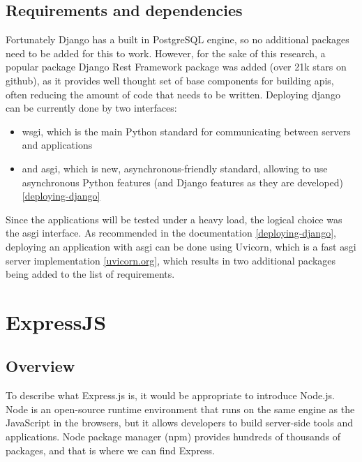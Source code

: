 \subsection{Requirements and dependencies}
Fortunately Django has a built in PostgreSQL engine, so no additional packages need to be added for this to work. However, for the sake of this research, a popular package Django Rest Framework package was added (over 21k stars on github), as it provides well thought set of base components for building \acrshort{api}s, often reducing the amount of code that needs to be written.
Deploying django can be currently done by two interfaces:
\begin{itemize}
    \item \acrshort{wsgi}, which is the main Python standard for communicating between servers and applications
    \item and \acrshort{asgi}, which is new, asynchronous-friendly standard, allowing to use asynchronous Python features (and Django features as they are developed) \ref{deploying-django}
\end{itemize}

Since the applications will be tested under a heavy load, the logical choice was the \acrshort{asgi} interface. As recommended in the documentation \ref{deploying-django}, deploying an application with \acrshort{asgi} can be done using Uvicorn, which is a fast \acrshort{asgi} server implementation \ref{uvicorn.org}, which results in two additional packages being added to the list of requirements.

\section{ExpressJS}

\subsection{Overview}

To describe what Express.js is, it would be appropriate to introduce Node.js. Node is an open-source runtime environment that runs on the same engine as the JavaScript in the browsers, but it allows developers to build server-side tools and applications. Node package manager (\acrshort{npm}) provides hundreds of thousands of packages, and that is where we can find Express. %

